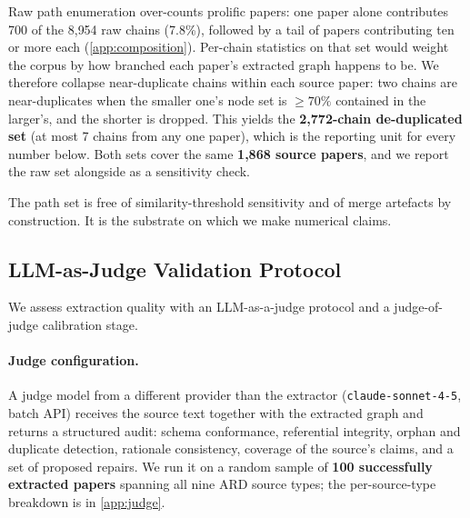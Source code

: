 \documentclass[10pt,twocolumn,letterpaper]{article}
\begin{document}
Raw path enumeration over-counts prolific papers: one paper alone contributes 700 of the
8{,}954 raw chains (7.8\%), followed by a tail of papers contributing ten or more each
(\cref{app:composition}). Per-chain statistics on that set would weight the corpus by how
branched each paper's extracted graph happens to be. We therefore collapse near-duplicate chains
within each source paper: two chains are near-duplicates when the smaller one's node set
is $\geq 70\%$ contained in the larger's, and the shorter is dropped. This yields the
\textbf{2{,}772-chain de-duplicated set} (at most 7 chains from any one paper), which is
the reporting unit for every number below. Both sets cover the same \textbf{1{,}868
source papers}, and we report the raw set alongside as a sensitivity check.

The path set is free of similarity-threshold sensitivity and of merge artefacts by
construction. It is the substrate on which we make numerical claims.

\subsection{LLM-as-Judge Validation Protocol}
\label{sec:m-validation}

We assess extraction quality with an LLM-as-a-judge protocol \citep{zheng2023judging}
and a judge-of-judge calibration stage.

\paragraph{Judge configuration.} A judge model from a different provider than the
extractor (\texttt{claude-sonnet-4-5}, batch API) receives the source text together with
the extracted graph and returns a structured audit: schema conformance, referential
integrity, orphan and duplicate detection, rationale consistency, coverage of the
source's claims, and a set of proposed repairs. We run it on a random sample of
\textbf{100 successfully extracted papers} spanning all nine ARD source types; the
per-source-type breakdown is in \cref{app:judge}.
\end{document}
